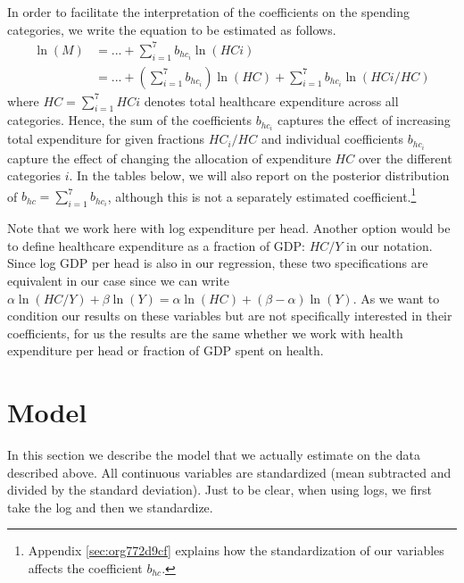 \documentclass[a4paper,12pt]{article}
\begin{document}
In order to facilitate the interpretation of the coefficients on the spending categories, we write the equation to be estimated as follows.
\begin{align}
\label{eq:17}
\ln(M) &= ... + \sum_{i=1}^7 b_{hc_i} \ln(HCi) \\
\label{eq:18}
 &= ... + \left(\sum_{i=1}^7 b_{hc_i} \right) \ln(HC) +  \sum_{i=1}^7 b_{hc_i} \ln(HCi/HC) 
\end{align}
where \(HC =  \sum_{i=1}^7 HCi\) denotes total healthcare expenditure across all categories. Hence, the sum of the coefficients \(b_{hc_i}\) captures the effect of increasing total expenditure for given fractions \(HC_i/HC\) and individual coefficients \(b_{hc_i}\) capture the effect of changing the allocation of expenditure \(HC\) over the different categories \(i\). In the tables below, we will also report on the posterior distribution of \(b_{hc}= \sum_{i=1}^7 b_{hc_i}\), although this is not a separately estimated coefficient.\footnote{Appendix \ref{sec:org772d9cf} explains how the standardization of our variables affects the coefficient \(b_{hc}\).}

Note that we work here with log expenditure per head. Another option would be to define healthcare expenditure as a fraction of GDP: \(HC/Y\) in our notation. Since log GDP per head is also in our regression, these two specifications are equivalent in our case since we can write \(\alpha \ln(HC/Y) + \beta \ln(Y) = \alpha \ln(HC) + (\beta-\alpha) \ln(Y)\). As we want to condition our results on these variables but are not specifically interested in their coefficients, for us the results are the same whether we work with health expenditure per head or fraction of GDP spent on health.




\section{Model}
\label{sec:org075186a}

In this section we describe the model that we actually estimate on the data described above.  All continuous variables are standardized (mean subtracted and divided by the standard deviation). Just to be clear, when using logs, we first take the log and then we standardize.
\end{document}
